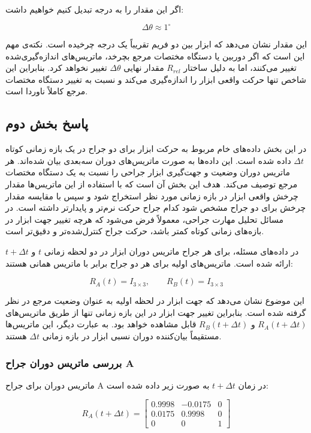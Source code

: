 \documentclass{article}
\begin{document}
اگر این مقدار را به درجه تبدیل کنیم خواهیم داشت:

\[
\Delta\theta \approx 1^\circ
\]

این مقدار نشان می‌دهد که ابزار بین دو فریم تقریباً یک درجه چرخیده است. نکته‌ی مهم این است که اگر دوربین یا دستگاه مختصات مرجع بچرخد، ماتریس‌های اندازه‌گیری‌شده تغییر می‌کنند، اما به دلیل ساختار \(R_{rel}\) مقدار نهایی \(\Delta\theta\) تغییر نخواهد کرد. بنابراین این شاخص تنها حرکت واقعی ابزار را اندازه‌گیری می‌کند و نسبت به تغییر دستگاه مختصات مرجع کاملاً ناوردا است.


\subsection{پاسخ بخش دوم}

در این بخش داده‌های خام مربوط به حرکت ابزار برای دو جراح در یک بازه زمانی کوتاه $\Delta t$ داده شده است. این داده‌ها به صورت ماتریس‌های دوران سه‌بعدی بیان شده‌اند. هر ماتریس دوران وضعیت و جهت‌گیری ابزار جراحی را نسبت به یک دستگاه مختصات مرجع توصیف می‌کند. هدف این بخش آن است که با استفاده از این ماتریس‌ها مقدار چرخش واقعی ابزار در بازه زمانی مورد نظر استخراج شود و سپس با مقایسه مقدار چرخش برای دو جراح مشخص شود کدام جراح حرکت نرم‌تر و پایدارتر داشته است. در مسائل تحلیل مهارت جراحی، معمولاً فرض می‌شود که هرچه تغییر جهت ابزار در بازه‌های زمانی کوتاه کمتر باشد، حرکت جراح کنترل‌شده‌تر و دقیق‌تر است.

در داده‌های مسئله، برای هر جراح ماتریس دوران ابزار در دو لحظه زمانی $t$ و $t+\Delta t$ ارائه شده است. ماتریس‌های اولیه برای هر دو جراح برابر با ماتریس همانی هستند:

\[
R_A(t)=I_{3\times3}, \qquad R_B(t)=I_{3\times3}
\]

این موضوع نشان می‌دهد که جهت ابزار در لحظه اولیه به عنوان وضعیت مرجع در نظر گرفته شده است. بنابراین تغییر جهت ابزار در این بازه زمانی تنها از طریق ماتریس‌های $R_A(t+\Delta t)$ و $R_B(t+\Delta t)$ قابل مشاهده خواهد بود. به عبارت دیگر، این ماتریس‌ها مستقیماً بیان‌کننده دوران نسبی ابزار در بازه زمانی $\Delta t$ هستند.

\subsubsection{بررسی ماتریس دوران جراح A}

ماتریس دوران برای جراح A در زمان $t+\Delta t$ به صورت زیر داده شده است:

\[
R_A(t+\Delta t)=
\begin{bmatrix}
	0.9998 & -0.0175 & 0\\
	0.0175 & 0.9998 & 0\\
	0 & 0 & 1
\end{bmatrix}
\]
\end{document}
